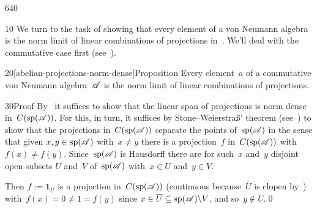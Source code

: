 \begin{parsec}{640}%
\begin{point}{10}%
We turn
to the task of showing that every element
of a von Neumann
algebra is the norm limit of linear combinations
of projections in~.
We'll deal with the  commutative case first
(see~).
\end{point}
\begin{point}{20}[abelian-projections-norm-dense]{Proposition}%
Every element~$a$ of a commutative von Neumann algebra~$\mathscr{A}$
is the norm limit
of linear combinations of projections.
\begin{point}{30}{Proof}%
By~
it suffices to show that the linear span
of projections is norm dense
in~$C(\mathrm{sp}(\mathscr{A}))$.
For this, in turn, it suffices 
by Stone--Weierstra\ss{}' theorem
(see~)
to show that the projections in~$C(\mathrm{sp}(\mathscr{A}))$
separate the points of~$\mathrm{sp}(\mathscr{A})$
in the sense
that given $x,y\in\mathrm{sp}(\mathscr{A})$
with~$x\neq y$
there is a projection~$f$ in~$C(\mathrm{sp}(\mathscr{A}))$
with~$f(x)\neq f(y)$.
Since~$\mathrm{sp}(\mathscr{A})$
is Hausdorff
there are for such~$x$ and~$y$
disjoint open subsets $U$ and~$V$
of~$\mathrm{sp}(\mathscr{A})$
with~$x\in U$ and~$y\in V$.

Then
$f:=\mathbf{1}_{\overline{U}}$
is a projection in~$C(\mathrm{sp}(\mathscr{A}))$
(continuous
because~$\overline{U}$
is clopen by~)
with~$f(x)=0\neq 1=f(y)$
since $x\in \overline{U}\subseteq \mathrm{sp}(\mathscr{A})\backslash V$,
and so~$y\notin \overline{U}$.\qed
\end{point}
\end{point}
\end{parsec}
